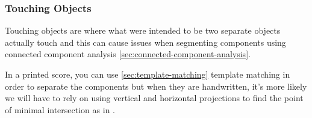 \subsubsection{Touching Objects}

Touching objects are where what were intended to be two separate objects actually touch and this can cause issues when segmenting components using connected component analysis \cref{sec:connected-component-analysis}. 

In a printed score, you can use \cref{sec:template-matching} template matching in order to separate the components but when they are handwritten, it's more likely we will have to rely on using vertical and horizontal projections to find the point of minimal intersection as in \cite{fujinaga1996adaptive}.
